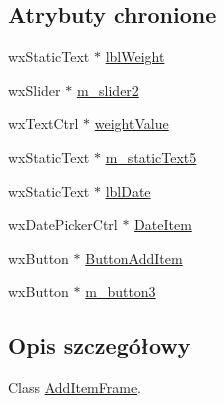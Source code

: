 \subsection*{Atrybuty chronione}
\begin{DoxyCompactItemize}
\item 
wx\+Static\+Text $\ast$ \hyperlink{class_add_item_frame_a6a9da7cb41a654ae06ea7e64676db36f}{lbl\+Weight}
\item 
wx\+Slider $\ast$ \hyperlink{class_add_item_frame_a840b2b66c739c9eb6d34234335435a3d}{m\+\_\+slider2}
\item 
wx\+Text\+Ctrl $\ast$ \hyperlink{class_add_item_frame_a88e5bac41b035d903073637e97998d50}{weight\+Value}
\item 
wx\+Static\+Text $\ast$ \hyperlink{class_add_item_frame_a772f2c686c3bf03a8d5ff1bfef9ccd81}{m\+\_\+static\+Text5}
\item 
wx\+Static\+Text $\ast$ \hyperlink{class_add_item_frame_ad08250f82a948ebff2f65d60c45c7f54}{lbl\+Date}
\item 
wx\+Date\+Picker\+Ctrl $\ast$ \hyperlink{class_add_item_frame_a8096f40b89662727687011b68c2ea955}{Date\+Item}
\item 
wx\+Button $\ast$ \hyperlink{class_add_item_frame_a35bd911645a80d7082315998cb6cbfb7}{Button\+Add\+Item}
\item 
wx\+Button $\ast$ \hyperlink{class_add_item_frame_a29e406c8fa85a1c85e0765d271c6517b}{m\+\_\+button3}
\end{DoxyCompactItemize}


\subsection{Opis szczegółowy}
Class \hyperlink{class_add_item_frame}{Add\+Item\+Frame}. 

